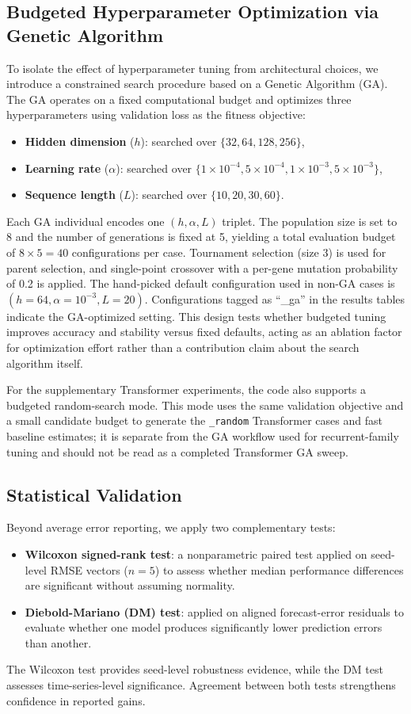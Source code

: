 \subsection{Budgeted Hyperparameter Optimization via Genetic Algorithm}
To isolate the effect of hyperparameter tuning from architectural choices, we introduce a constrained search procedure based on a Genetic Algorithm (GA). The GA operates on a fixed computational budget and optimizes three hyperparameters using validation loss as the fitness objective:
\begin{itemize}
    \item \textbf{Hidden dimension} ($h$): searched over $\{32, 64, 128, 256\}$,
    \item \textbf{Learning rate} ($\alpha$): searched over $\{1 \times 10^{-4}, 5 \times 10^{-4}, 1 \times 10^{-3}, 5 \times 10^{-3}\}$,
    \item \textbf{Sequence length} ($L$): searched over $\{10, 20, 30, 60\}$.
\end{itemize}
Each GA individual encodes one $(h, \alpha, L)$ triplet. The population size is set to 8 and the number of generations is fixed at 5, yielding a total evaluation budget of $8 \times 5 = 40$ configurations per case. Tournament selection (size 3) is used for parent selection, and single-point crossover with a per-gene mutation probability of 0.2 is applied. The hand-picked default configuration used in non-GA cases is $(h=64, \alpha=10^{-3}, L=20)$. Configurations tagged as ``\_ga'' in the results tables indicate the GA-optimized setting. This design tests whether budgeted tuning improves accuracy and stability versus fixed defaults, acting as an ablation factor for optimization effort rather than a contribution claim about the search algorithm itself.

For the supplementary Transformer experiments, the code also supports a budgeted random-search mode. This mode uses the same validation objective and a small candidate budget to generate the \texttt{\_random} Transformer cases and fast baseline estimates; it is separate from the GA workflow used for recurrent-family tuning and should not be read as a completed Transformer GA sweep.

\subsection{Statistical Validation}
Beyond average error reporting, we apply two complementary tests:
\begin{itemize}
    \item \textbf{Wilcoxon signed-rank test}: a nonparametric paired test applied on seed-level RMSE vectors ($n=5$) to assess whether median performance differences are significant without assuming normality.
    \item \textbf{Diebold-Mariano (DM) test}: applied on aligned forecast-error residuals to evaluate whether one model produces significantly lower prediction errors than another.
\end{itemize}
The Wilcoxon test provides seed-level robustness evidence, while the DM test assesses time-series-level significance. Agreement between both tests strengthens confidence in reported gains.
